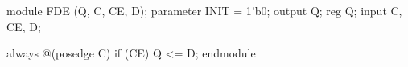 \begin{vcode}
module FDE (Q, C, CE, D);
    parameter INIT = 1'b0;
    output Q;
    reg    Q;
    input  C, CE, D;

    always @(posedge C)
        if (CE)
        Q <= D;
endmodule
\end{vcode}

